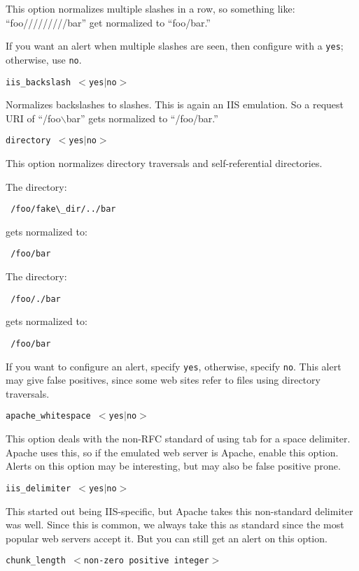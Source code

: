 \documentclass[english]{report}
\newcounter{slistnum}
\newenvironment{slist}
{ \begin{list}{ {\bf \arabic{slistnum}.} }{\usecounter{slistnum} } }
{ \end{list} }
\begin{document}
\begin{slist}
This option normalizes multiple slashes in a row, so something like:
``foo/////////bar'' get normalized to ``foo/bar.''

If you want an alert when multiple slashes are seen, then configure with a \texttt{yes}; otherwise, use \texttt{no}.

\item \texttt{iis\_backslash $<$yes$|$no$>$}

Normalizes backslashes to slashes.  This is again an IIS emulation.  So a
request URI of ``/foo$\backslash$bar'' gets normalized to ``/foo/bar.''

\item \texttt{directory $<$yes$|$no$>$}

This option normalizes directory traversals and self-referential directories.

The directory:
\begin{verbatim} /foo/fake\_dir/../bar \end{verbatim}
gets normalized to:
\begin{verbatim} /foo/bar \end{verbatim}

The directory:
\begin{verbatim} /foo/./bar \end{verbatim}
gets normalized to:
\begin{verbatim} /foo/bar \end{verbatim}

If you want to configure an alert, specify \texttt{yes}, otherwise, specify \texttt{no}.  This alert may give false positives, since some web sites refer to files using directory traversals.

\item \texttt{apache\_whitespace $<$yes$|$no$>$}

This option deals with the non-RFC standard of using tab for a space delimiter.  Apache
uses this, so if the emulated web server is Apache, enable this
option.  Alerts on this option may be interesting, but may also be false
positive prone.

\item \texttt{iis\_delimiter $<$yes$|$no$>$}

This started out being IIS-specific, but Apache takes this non-standard
delimiter was well.  Since this is common, we always take this as standard
since the most popular web servers accept it.  But you can still get an alert
on this option.

\item \texttt{chunk\_length $<$non-zero positive integer$>$}


\end{slist}
\end{document}
